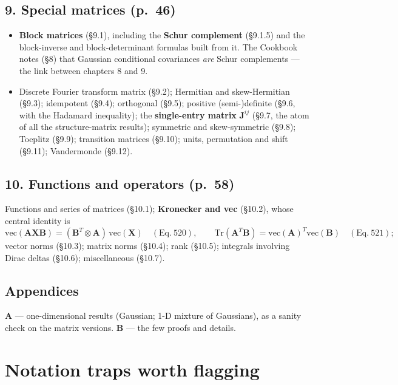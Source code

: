 \documentclass[10pt,a4paper]{article}
\begin{document}
\subsection{9. Special matrices (p.~46)}
\begin{itemize}
\item \textbf{Block matrices} (\S9.1), including the \textbf{Schur complement}
      (\S9.1.5) and the block-inverse and block-determinant formulas built from it.
      The Cookbook notes (\S8) that Gaussian conditional covariances \emph{are} Schur
      complements --- the link between chapters 8 and 9.
\item Discrete Fourier transform matrix (\S9.2); Hermitian and skew-Hermitian
      (\S9.3); idempotent (\S9.4); orthogonal (\S9.5); positive (semi-)definite
      (\S9.6, with the Hadamard inequality); the \textbf{single-entry matrix}
      $\mathbf{J}^{ij}$ (\S9.7, the atom of all the structure-matrix results);
      symmetric and skew-symmetric (\S9.8); Toeplitz (\S9.9); transition matrices
      (\S9.10); units, permutation and shift (\S9.11); Vandermonde (\S9.12).
\end{itemize}

\subsection{10. Functions and operators (p.~58)}
Functions and series of matrices (\S10.1); \textbf{Kronecker and vec} (\S10.2), whose
central identity is
\[
\mathrm{vec}(\mathbf{AXB})=(\mathbf{B}^{T}\otimes\mathbf{A})\,\mathrm{vec}(\mathbf{X})
\quad(\text{Eq.}~520),
\qquad
\mathrm{Tr}(\mathbf{A}^{T}\mathbf{B})=\mathrm{vec}(\mathbf{A})^{T}\mathrm{vec}(\mathbf{B})
\quad(\text{Eq.}~521);
\]
vector norms (\S10.3); matrix norms (\S10.4); rank (\S10.5); integrals involving Dirac
deltas (\S10.6); miscellaneous (\S10.7).

\subsection{Appendices}
\textbf{A} --- one-dimensional results (Gaussian; 1-D mixture of Gaussians), as a
sanity check on the matrix versions.  \textbf{B} --- the few proofs and details.

\section{Notation traps worth flagging}
\end{document}
